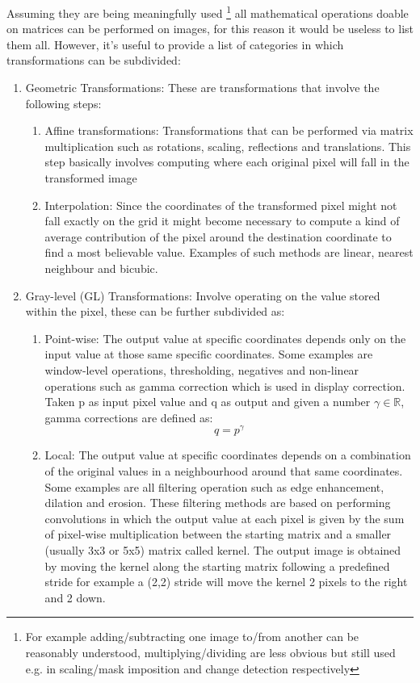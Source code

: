 Assuming they are being meaningfully used \footnote{For example adding/subtracting one image to/from another can be reasonably understood, multiplying/dividing are less obvious but still used e.g. in scaling/mask imposition and change detection respectively} all mathematical operations doable on matrices can be performed on images, for this reason it would be useless to list them all. However, it's useful to provide a list of categories in which transformations can be subdivided:

\begin{enumerate}
\item Geometric Transformations: These are transformations that involve the following steps:
		\begin{enumerate}
		\item Affine transformations: Transformations that can be performed via matrix multiplication such as rotations, scaling, reflections and translations. This step basically involves computing where each original pixel will fall in the transformed image
		\item Interpolation: Since the coordinates of the transformed pixel might not fall exactly on the grid it might become necessary to compute a kind of average contribution of the pixel around the destination coordinate to find a most believable value. Examples of such methods are linear, nearest neighbour and bicubic.
		\end{enumerate}
\item Gray-level (GL) Transformations: Involve operating on the value stored within the pixel, these can be further subdivided as:
		\begin{enumerate}
		\item Point-wise: The output value at specific coordinates depends only on the input value at those same specific coordinates. Some examples are window-level operations, thresholding, negatives and non-linear operations such as gamma correction which is used in display correction. Taken p as input pixel value and q as output and given a number $\gamma \in \mathbb{R}$, gamma corrections are defined as:
		\begin{equation}
		q = p^{\gamma}
		\end{equation}
    \item Local: The output value at specific coordinates depends on a combination of the original values in a neighbourhood around that same coordinates. Some examples are all filtering operation such as edge enhancement, dilation and erosion. These filtering methods are based on performing convolutions in which the output value at each pixel is given by the sum of pixel-wise multiplication between the starting matrix and a smaller (usually 3x3 or 5x5) matrix called kernel. The output image is obtained by moving the kernel along the starting matrix following a predefined stride for example a (2,2) stride will move the kernel 2 pixels to the right and 2 down.

\end{enumerate}
\end{enumerate}
